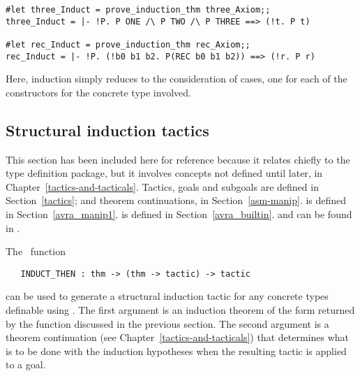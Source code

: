 {{\begin{session}\begin{verbatim}
#let three_Induct = prove_induction_thm three_Axiom;;
three_Induct = |- !P. P ONE /\ P TWO /\ P THREE ==> (!t. P t)

#let rec_Induct = prove_induction_thm rec_Axiom;;
rec_Induct = |- !P. (!b0 b1 b2. P(REC b0 b1 b2)) ==> (!r. P r)
\end{verbatim}\end{session}

\noindent Here, induction simply reduces to the consideration of
cases, one for each of the constructors for the concrete type involved.

\subsection{Structural induction tactics}
\label{avrasi}

This section has been included here for reference
because it relates chiefly to the
type definition package, but it involves concepts not defined until
later, in Chapter~\ref{tactics-and-tacticals}. Tactics, goals
and subgoals are
defined in Section~\ref{tactics}; and theorem continuations, in
Section~\ref{asm-manip}.  is defined in Section~\ref{avra_manip1}.
 is defined in Section~\ref{avra_builtin}.
  and  can be found in \REFERENCE.

The \ML\ function

\begin{boxed}
\begin{verbatim}
   INDUCT_THEN : thm -> (thm -> tactic) -> tactic
\end{verbatim}\end{boxed}

\noindent can be used to generate
a structural induction tactic
for any concrete types definable using .  The first argument
is an induction theorem of the form returned by the function
 discussed in the previous section.  The second
argument is a theorem continuation (see
Chapter~\ref{tactics-and-tacticals}) that determines what is to be done with
the induction hypotheses when the resulting tactic is applied to a goal.

}}
